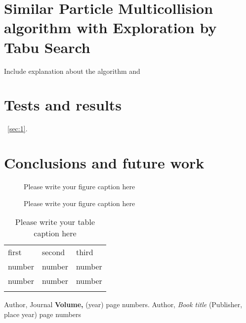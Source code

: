\section{Similar Particle Multicollision algorithm with Exploration by Tabu Search}
\label{sec:SPCETS}

Include explanation about the algorithm
and \cite{RefJ}

\section{Tests and results}
\label{sec:results}

~\ref{sec:1}.

\section{Conclusions and future work}
\label{sec:conclusions}

%
\begin{figure}
\caption{Please write your figure caption here}
\label{fig:1}       %
\end{figure}
%
\begin{figure*}
\vspace*{5cm}       %
\caption{Please write your figure caption here}
\label{fig:2}       %
\end{figure*}
%
\begin{table}
\caption{Please write your table caption here}
\label{tab:1}       %
\begin{tabular}{lll}
\hline\noalign{\smallskip}
first & second & third  \\
\noalign{\smallskip}\hline\noalign{\smallskip}
number & number & number \\
number & number & number \\
\noalign{\smallskip}\hline
\end{tabular}
\vspace*{5cm}  %
\end{table}
%
% 
% 
%
\begin{thebibliography}{}
%
%
Author, Journal \textbf{Volume,} (year) page numbers.
Author, \textit{Book title} (Publisher, place year) page numbers
\end{thebibliography}





